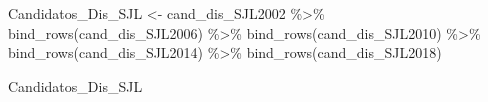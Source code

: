 \documentclass[
]{book}
\newenvironment{Shaded}{\begin{snugshade}}{\end{snugshade}}
\newcommand{\FunctionTok}[1]{\textcolor[rgb]{0.00,0.00,0.00}{#1}}
\newcommand{\NormalTok}[1]{#1}
\newcommand{\OtherTok}[1]{\textcolor[rgb]{0.56,0.35,0.01}{#1}}
\newcommand{\SpecialCharTok}[1]{\textcolor[rgb]{0.00,0.00,0.00}{#1}}
\begin{document}
\begin{Shaded}
\begin{Highlighting}[]
\NormalTok{Candidatos\_Dis\_SJL }\OtherTok{\textless{}{-}}\NormalTok{ cand\_dis\_SJL2002 }\SpecialCharTok{\%\textgreater{}\%} 
  \FunctionTok{bind\_rows}\NormalTok{(cand\_dis\_SJL2006) }\SpecialCharTok{\%\textgreater{}\%} 
  \FunctionTok{bind\_rows}\NormalTok{(cand\_dis\_SJL2010) }\SpecialCharTok{\%\textgreater{}\%} 
  \FunctionTok{bind\_rows}\NormalTok{(cand\_dis\_SJL2014) }\SpecialCharTok{\%\textgreater{}\%} 
   \FunctionTok{bind\_rows}\NormalTok{(cand\_dis\_SJL2018)}
\end{Highlighting}
\end{Shaded}

\begin{Shaded}
\begin{Highlighting}[]
\NormalTok{Candidatos\_Dis\_SJL}
\end{Highlighting}
\end{Shaded}
\end{document}
